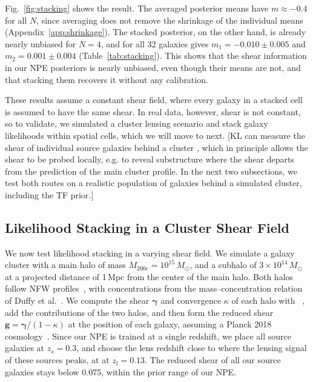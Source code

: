 Fig.~\ref{fig:stacking} shows the result. The averaged posterior means have $m \approx -0.4$ for all $N$, since averaging does not remove the shrinkage of the individual means (Appendix~\ref{app:shrinkage}). The stacked posterior, on the other hand, is already nearly unbiased for $N = 4$, and for all 32 galaxies gives $m_1 = -0.010 \pm 0.005$ and $m_2 = 0.001 \pm 0.004$ (Table~\ref{tab:stacking}). This shows that the shear information in our NPE posteriors is nearly unbiased, even though their means are not, and that stacking them recovers it without any calibration.

These results assume a constant shear field, where every galaxy in a stacked cell is assumed to have the same shear. In real data, however, shear is not constant, so to validate, we simulated a cluster lensing scenario and stack galaxy likelihoods within spatial cells, which we will move to next. [KL can measure the shear of individual source galaxies behind a cluster \citep{KLCluster}, which in principle allows the shear to be probed locally, e.g. to reveal substructure where the shear departs from the prediction of the main cluster profile. In the next two subsections, we test both routes on a realistic population of galaxies behind a simulated cluster, including the TF prior.]

\subsection{Likelihood Stacking in a Cluster Shear Field}
\label{ssec:cluster}

We now test likelihood stacking in a varying shear field. We simulate a galaxy cluster with a main halo of mass $M_\mathrm{200c} = 10^{15}\,M_\odot$, and a subhalo of $3\times10^{14}\,M_\odot$ at a projected distance of 1\,Mpc from the center of the main halo. Both halos follow NFW profiles~\citep{NFW97}, with concentrations from the mass--concentration relation of Duffy et al.~\citep{Duffy08}. We compute the shear $\boldsymbol{\gamma}$ and convergence $\kappa$ of each halo with \galsim~\citep{galsim}, add the contributions of the two halos, and then form the reduced shear $\mathbf{g} = \boldsymbol{\gamma}/(1-\kappa)$ at the position of each galaxy, assuming a Planck 2018 cosmology~\citep{Planck18}. Since our NPE is trained at a single redshift, we place all source galaxies at $z_s = 0.3$, and choose the lens redshift close to where the lensing signal of these sources peaks, at at $z_l = 0.13$. The reduced shear of all our source galaxies stays below 0.075, within the prior range of our NPE.

